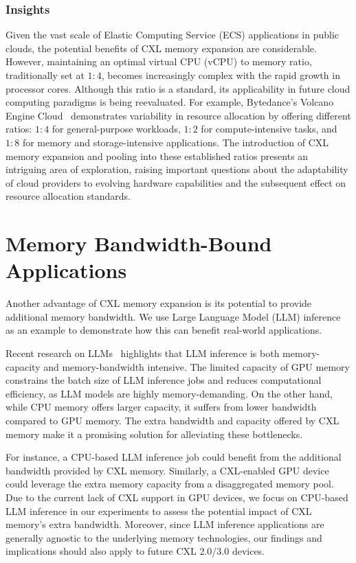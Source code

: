 \subsubsection{Insights}
Given the vast scale of Elastic Computing Service (ECS) applications in public clouds, the potential benefits of CXL memory expansion are considerable. However, maintaining an optimal virtual CPU (vCPU) to memory ratio, traditionally set at $1:4$, becomes increasingly complex with the rapid growth in processor cores. Although this ratio is a standard, its applicability in future cloud computing paradigms is being reevaluated. For example, Bytedance's Volcano Engine Cloud~\cite{volcano} demonstrates variability in resource allocation by offering different ratios: $1:4$ for general-purpose workloads, $1:2$ for compute-intensive tasks, and $1:8$ for memory and storage-intensive applications. The introduction of CXL memory expansion and pooling into these established ratios presents an intriguing area of exploration, raising important questions about the adaptability of cloud providers to evolving hardware capabilities and the subsequent effect on resource allocation standards.

\section{Memory Bandwidth-Bound Applications}
\label{sec:bandwidth}

Another advantage of CXL memory expansion is its potential to provide additional memory bandwidth. We use Large Language Model (LLM) inference as an example to demonstrate how this can benefit real-world applications.

Recent research on LLMs~\cite{gpt4} highlights that LLM inference is both memory-capacity and memory-bandwidth intensive. The limited capacity of GPU memory constrains the batch size of LLM inference jobs and reduces computational efficiency, as LLM models are highly memory-demanding. On the other hand, while CPU memory offers larger capacity, it suffers from lower bandwidth compared to GPU memory. The extra bandwidth and capacity offered by CXL memory make it a promising solution for alleviating these bottlenecks.

For instance, a CPU-based LLM inference job could benefit from the additional bandwidth provided by CXL memory. Similarly, a CXL-enabled GPU device could leverage the extra memory capacity from a disaggregated memory pool. Due to the current lack of CXL support in GPU devices, we focus on CPU-based LLM inference in our experiments to assess the potential impact of CXL memory’s extra bandwidth. Moreover, since LLM inference applications are generally agnostic to the underlying memory technologies, our findings and implications should also apply to future CXL 2.0/3.0 devices.


